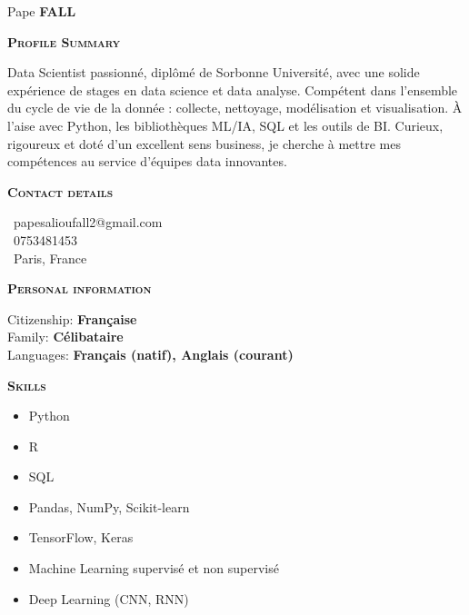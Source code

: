 \documentclass[11pt,a4paper]{article}
\newcommand{\headleft}[1]{\vspace*{3ex}\textsc{\textbf{#1}}\par%
    \vspace*{-1.5ex}\hrulefill\par\vspace*{0.7ex}}
\begin{document}
\setlength{\topskip}{0pt}\setlength{\parindent}{0pt}\setlength{\parskip}{0pt}
\setlength{\fboxsep}{0pt}\pagestyle{empty}\raggedbottom

\begin{minipage}[t]{0.33\textwidth}
\colorbox{cvblue}{\begin{minipage}[t][5mm][t]{\textwidth}\null\hfill\null\end{minipage}}
\vspace{-.2ex}
\colorbox{cvblue!90}{\color{white}
\textwidth
\begin{minipage}[t][293mm][t]{0.82\textwidth}\raggedright
\vspace*{2.5ex}

\Large Pape \textbf{\textsc{FALL}} \normalsize

\vspace*{0.5ex}

\headleft{Profile Summary}
Data Scientist passionné, diplômé de Sorbonne Université, avec une solide expérience de stages en data science et data analyse. Compétent dans l’ensemble du cycle de vie de la donnée : collecte, nettoyage, modélisation et visualisation. À l’aise avec Python, les bibliothèques ML/IA, SQL et les outils de BI. Curieux, rigoureux et doté d’un excellent sens business, je cherche à mettre mes compétences au service d’équipes data innovantes.

\headleft{Contact details}\small
\MVAt\ {\small papesalioufall2@gmail.com} \\[0.4ex]
\Mobilefone\ 0753481453 \\[0.5ex]
\Letter\ Paris, France
\normalsize

\headleft{Personal information}
Citizenship: \textbf{Française} \\[0.5ex]
Family: \textbf{Célibataire} \\[0.5ex]
Languages: \textbf{Français (natif), Anglais (courant)}

\headleft{Skills}
\begin{itemize}
  \item Python
  \item R
  \item SQL
  \item Pandas, NumPy, Scikit-learn
  \item TensorFlow, Keras
  \item Machine Learning supervisé et non supervisé
  \item Deep Learning (CNN, RNN)
\end{itemize}

\end{minipage}\textwidth
}
\end{minipage}
\end{document}
